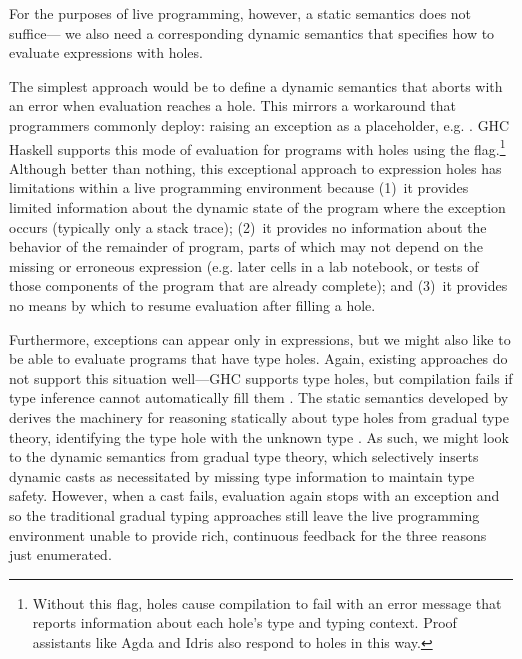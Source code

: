 %
For the purposes of live programming, however, a static semantics does not suffice---%
we also need a corresponding dynamic semantics that specifies how to evaluate expressions with holes. %
%

The simplest approach would be to define a dynamic semantics that aborts with an error when evaluation reaches a hole. 
%
This mirrors a workaround that programmers commonly deploy: 
raising an exception as a placeholder, e.g. . 
GHC Haskell supports this mode of evaluation for programs with holes using the  flag.\footnote{
Without this flag, holes cause compilation to fail with an error message that reports information about each hole's type and typing context. 
Proof assistants like Agda \cite{norell:thesis,norell2009dependently} and Idris \cite{brady2013idris} also respond to holes in this way.
} 
Although better than nothing, this exceptional approach to expression holes has limitations 
within a live programming environment because 
(1)~it provides limited information about the dynamic state of the program where the exception occurs
(typically only a stack trace);  
(2)~it provides no information about the behavior of the remainder of program, 
parts of which may not depend on the missing or erroneous expression (e.g. later cells in a lab notebook, or tests of those components of the program that are already complete); and 
(3)~it provides no means by which to resume evaluation after filling a hole.

Furthermore, exceptions can appear only in expressions, but we might also like to be able to evaluate programs that have type holes. Again, existing approaches do not support this situation well---GHC supports type holes, but compilation fails if type inference cannot automatically fill them \cite{GHCHoles}. 
The static semantics developed by \citet{popl-paper} derives the machinery for 
reasoning statically about type holes from gradual type theory, 
identifying the type hole with the unknown type \cite{DBLP:conf/snapl/SiekVCB15,Siek06a}.
%
As such, we might look to the dynamic semantics from
gradual type theory, 
which selectively inserts dynamic casts as necessitated by missing type information to maintain type safety. 
However, when a cast fails, evaluation again stops with 
an exception and so the traditional gradual typing approaches still leave the live programming environment unable to provide rich, continuous feedback for the three reasons just enumerated.

